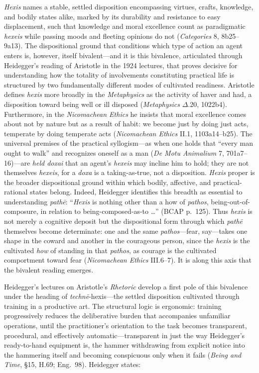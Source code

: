 \documentclass{article}
\begin{document}
\textit{Hexis} names a stable, settled disposition encompassing virtues, crafts, knowledge, and bodily states alike, marked by its durability and resistance to easy displacement, such that knowledge and moral excellence count as paradigmatic \textit{hexeis} while passing moods and fleeting opinions do not (\textit{Categories} 8, 8b25--9a13). The dispositional ground that conditions which type of action an agent enters is, however, itself bivalent---and it is this bivalence, articulated through Heidegger's reading of Aristotle in the 1924 lectures, that proves decisive for understanding how the totality of involvements constituting practical life is structured by two fundamentally different modes of cultivated readiness. Aristotle defines \textit{hexis} more broadly in the \textit{Metaphysics} as the activity of haver and had, a disposition toward being well or ill disposed (\textit{Metaphysics} $\Delta$.20, 1022b4). Furthermore, in the \textit{Nicomachean Ethics} he insists that moral excellence comes about not by nature but as a result of habit: we become just by doing just acts, temperate by doing temperate acts (\textit{Nicomachean Ethics} II.1, 1103a14--b25). The universal premises of the practical syllogism---as when one holds that ``every man ought to walk'' and recognizes oneself as a man (\textit{De Motu Animalium} 7, 701a7--16)---are \textit{held doxai} that an agent's \textit{hexeis} may incline him to hold; they are not themselves \textit{hexeis}, for a \textit{doxa} is a taking-as-true, not a disposition. \textit{Hexis} proper is the broader dispositional ground within which bodily, affective, and practical-rational states belong. Indeed, Heidegger identifies this breadth as essential to understanding \textit{pathē}: ``\textit{Hexis} is nothing other than a how of \textit{pathos}, being-out-of-composure, in relation to being-composed-as-to \ldots'' (BCAP p.~125). Thus \textit{hexis} is not merely a cognitive deposit but the dispositional form through which \textit{pathē} themselves become determinate: one and the same \textit{pathos}---fear, say---takes one shape in the coward and another in the courageous person, since the \textit{hexis} is the cultivated \textit{how} of standing in that \textit{pathos}, as courage is the cultivated comportment toward fear (\textit{Nicomachean Ethics} III.6--7). It is along this axis that the bivalent reading emerges.

Heidegger's lectures on Aristotle's \textit{Rhetoric} develop a first pole of this bivalence under the heading of \textit{techn\=e}-hexis---the settled disposition cultivated through training in a productive art. The structural logic is ergonomic: training progressively reduces the deliberative burden that accompanies unfamiliar operations, until the practitioner's orientation to the task becomes transparent, procedural, and effectively automatic---transparent in just the way Heidegger's ready-to-hand equipment is, the hammer withdrawing from explicit notice into the hammering itself and becoming conspicuous only when it fails (\textit{Being and Time}, \S15, H.69; Eng.~98). Heidegger states:
\end{document}
